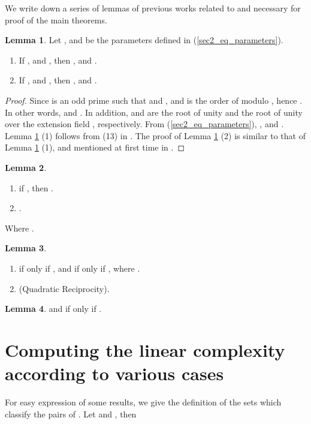 \documentclass{mcom-l}
\theoremstyle{definition}
\newtheorem{sec2lemma1x}{Lemma}[section]
\newtheorem{sec2lemma2x}[sec2lemma1x]{Lemma}
\newtheorem{sec2lemma3x}[sec2lemma1x]{Lemma}
\newtheorem{sec2lemma4x}[sec2lemma1x]{Lemma}
\numberwithin{equation}{section}
\begin{document}
    We write down a series of lemmas of previous works related to and necessary for proof of the main theorems.
    \begin{sec2lemma1x}\label{lab_sec2_lemma1x}Let , and  be the parameters defined in (\ref{sec2_eq_parameters}).
     \begin{enumerate} \item If , and , then , and .
     \item If , and , then , and .
     \end{enumerate}
     \end{sec2lemma1x}
     \begin{proof}
     Since  is an odd prime such that  and , and  is the order of  modulo , hence . In other words,  and . In addition,  and  are the  root of unity and the  root of unity over the extension field , respectively. From    (\ref{sec2_eq_parameters}), , and . Lemma \ref{lab_sec2_lemma1x} (1) follows from (13) in \cite{B4}. The proof of Lemma \ref{lab_sec2_lemma1x} (2) is similar to that of Lemma \ref{lab_sec2_lemma1x} (1), and mentioned at first time in \cite{B18}.
     \end{proof}
    \begin{sec2lemma2x}\cite{B10,B13}\label{lab_sec2_lemma2x}
    \begin{enumerate} \item if , then .
    \item .
    \end{enumerate}
    \end{sec2lemma2x} 
    Where . 
    \begin{sec2lemma3x}\cite{B19}\label{lab_sec2_lemma3x}
     \begin{enumerate} \item 
     if only if , and  if only if , where .
     \item
     (Quadratic Reciprocity).
     
    \end{enumerate}
    \end{sec2lemma3x}
    \begin{sec2lemma4x}\cite{B14}\label{lab_sec2_lemma4x}
      and  if only if .
    \end{sec2lemma4x}
   \section{Computing the linear complexity according to various cases}
         For easy expression of some results, we give the definition of the sets which classify the pairs of . Let  and , then
         
\end{document}
